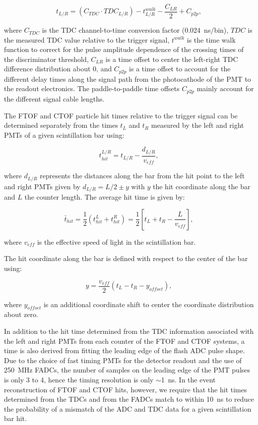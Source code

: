 \documentclass{elsart}
\begin{document}
\begin{equation}
t_{L/R} = (C_{TDC} \cdot TDC_{L/R}) - t_{L/R}^{walk} - \frac{C_{LR}}{2} + C_{p2p},
\end{equation}

\noindent
where $C_{TDC}$ is the TDC channel-to-time conversion factor (0.024~ns/bin), $TDC$ is the measured TDC value
relative to the trigger signal, $t^{walk}$ is the time walk function to correct for the pulse amplitude dependence of
the crossing times of the discriminator threshold, $C_{LR}$ is a time offset to center the left-right TDC difference
distribution about 0, and $C_{p2p}$ is a time offset to account for the different delay times along the signal path from
the photocathode of the PMT to the readout electronics. The paddle-to-paddle time offsets $C_{p2p}$ mainly account
for the different signal cable lengths.

The FTOF and CTOF particle hit times relative to the trigger signal can be determined separately from the times
$t_L$ and $t_R$ measured by the left and right PMTs of a given scintillation bar using:

\begin{equation}
t_{hit}^{L/R} = t_{L/R} - \frac{d_{L/R}}{v_{eff}},
\end{equation}

\noindent
where $d_{L/R}$ represents the distances along the bar from the hit point to the left and right PMTs given by
$d_{L/R}= L/2 \pm y$ with $y$ the hit coordinate along the bar and $L$ the counter length. The average hit time
is given by:

\begin{equation}
\bar{t}_{hit} = \frac{1}{2} ( t_{hit}^L + t_{hit}^R ) = \frac{1}{2} \left[ t_L + t_R - \frac{L}{v_{eff}} \right],
\end{equation}

\noindent
where $v_{eff}$ is the effective speed of light in the scintillation bar.

The hit coordinate along the bar is defined with respect to the center of the bar using:

\begin{equation}
  \label{tof-coor}
  y = \frac{v_{eff}}{2} (t_L - t_R - y_{offset}),
\end{equation}

\noindent
where $y_{offset}$ is an additional coordinate shift to center the coordinate distribution about zero.

In addition to the hit time determined from the TDC information associated with the left and right PMTs
from each counter of the FTOF and CTOF systems, a time is also derived from fitting the leading edge of
the flash ADC pulse shape. Due to the choice of fast timing PMTs for the detector readout and the use of
250~MHz FADCs, the number of samples on the leading edge of the PMT pulses is only 3 to 4, hence
the timing resolution is only $\sim$1~ns. In the event reconstruction of FTOF and CTOF hits, however, we
require that the hit times determined from the TDCs and from the FADCs match to within 10~ns to
reduce the probability of a mismatch of the ADC and TDC data for a given scintillation bar hit.
\end{document}
